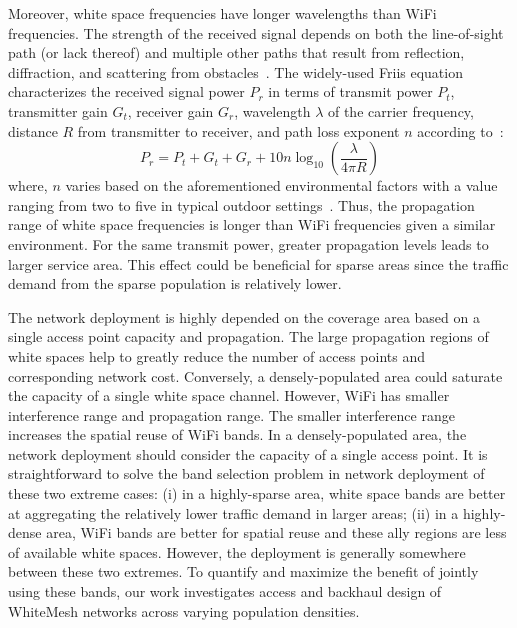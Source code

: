 Moreover, white space frequencies have longer wavelengths than WiFi frequencies. 
The strength of the received signal depends on both the line-of-sight path (or lack 
thereof) and multiple other paths that result from reflection, diffraction, and scattering 
from obstacles~\cite{andersen1995propagation}. The widely-used Friis equation characterizes 
the received signal power $P_r$ in terms of transmit power $P_t$, transmitter gain $G_t$, 
receiver gain $G_r$, wavelength $\lambda$ of the carrier frequency, distance $R$ from transmitter 
to receiver, and path loss exponent $n$ according to~\cite{friis}:
\begin{equation}
\label{eq:friis}
P_r=P_t+G_t+G_r+10n \log_{10}\left( \frac{\lambda}{4\pi R}\right)
\end{equation}
where, $n$ varies based on the aforementioned environmental factors with a value 
ranging from two to five in typical outdoor settings~\cite{rappaport}.
Thus, the propagation range of white space frequencies is longer than WiFi frequencies
given a similar environment. For the same transmit power, greater propagation levels leads to larger service area.
This effect could be beneficial for sparse areas since the traffic demand from the sparse population is relatively lower. 

The network deployment is highly depended on the coverage area based on a single access point capacity and propagation. 
The large propagation regions of white spaces help to greatly reduce the number of access points and corresponding network cost. 
Conversely, a densely-populated area could saturate the capacity of a single white space channel. 
However, WiFi has smaller interference range and propagation range. The smaller interference range increases 
the spatial reuse of WiFi bands. In a densely-populated area, the network deployment should consider the 
capacity of a single access point. It is straightforward to solve the band selection problem in network deployment 
of these two extreme cases: (i) in a highly-sparse area, white space bands are better at aggregating the 
relatively lower traffic demand in larger areas; (ii) in a highly-dense area, WiFi bands are better 
for spatial reuse and these ally regions are less of available white spaces.
However, the deployment is generally somewhere between these two extremes. 
To quantify and maximize the benefit of jointly using these bands, 
our work investigates access and backhaul design of WhiteMesh networks across varying population densities. 



